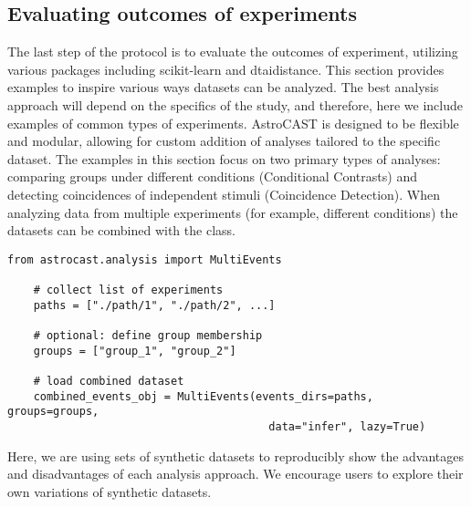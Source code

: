 \subsection{Evaluating outcomes of experiments}

The last step of the protocol is to evaluate the outcomes of experiment, utilizing various packages including scikit-learn and dtaidistance\citep{pedregosa_scikit-learn_2011,meert_wannes_dtaidistance_2020,mcinnes_umap_2018,mcinnes_hdbscan_2017}. This section provides examples to inspire various ways datasets can be analyzed. The best analysis approach will depend on the specifics of the study, and therefore, here we include examples of common types of experiments. AstroCAST is designed to be flexible and modular, allowing for custom addition of analyses tailored to the specific dataset. The examples in this section focus on two primary types of analyses: comparing groups under different conditions (Conditional Contrasts) and detecting coincidences of independent stimuli (Coincidence Detection). When analyzing data from multiple experiments (for example, different conditions) the datasets can be combined with the  class.

\begin{lstlisting}[style=pyStyle]
    from astrocast.analysis import MultiEvents

    # collect list of experiments
    paths = ["./path/1", "./path/2", ...]

    # optional: define group membership
    groups = ["group_1", "group_2"]

    # load combined dataset
    combined_events_obj = MultiEvents(events_dirs=paths, groups=groups,
                                        data="infer", lazy=True)
\end{lstlisting}

Here, we are using sets of synthetic datasets to reproducibly show the advantages and disadvantages of each analysis approach. We encourage users to explore their own variations of synthetic datasets.

